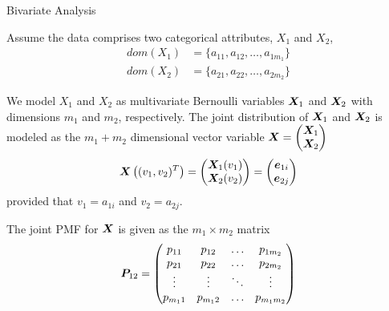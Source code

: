\begin{frame}{Bivariate Analysis}

  \small
Assume the data comprises two categorical
attributes, $X_1$ and $X_2$,
\begin{align*}
dom(X_1) &= \{a_{11}, a_{12}, \ldots, a_{1m_1}\}\\
dom(X_2) &= \{a_{21}, a_{22}, \ldots, a_{2m_2}\}
\end{align*}

We model
$X_1$ and $X_2$ as multivariate Bernoulli variables ${\boldsymbol X}_1$ and
${\boldsymbol X}_2$ with dimensions $m_1$ and $m_2$, respectively.
The joint distribution of ${\boldsymbol X}_1$ and ${\boldsymbol X}_2$
is modeled as the $m_1+m_2$ dimensional
vector variable ${\boldsymbol X} = \begin{pmatrix} {\boldsymbol X}_1\\{\boldsymbol X}_2 \end{pmatrix}$
\begin{align*}
{\boldsymbol X}\left((v_1, v_2)^T\right) = \begin{pmatrix} {\boldsymbol X}_1(v_1)\\{\boldsymbol X}_2(v_2) \end{pmatrix}
= \begin{pmatrix} {\boldsymbol e}_{1i}\\ {\boldsymbol e}_{2j} \end{pmatrix}
\end{align*}
provided that  $v_1 = a_{1i}$ and $v_2 = a_{2j}$.

The joint PMF for ${\boldsymbol X}$ is given as the $m_1 \times
m_2$ matrix
\begin{align*}
    {\boldsymbol P}_{12} =
    \begin{pmatrix} 
    p_{11} & p_{12} & \dots & p_{1m_2}\\
    p_{21} & p_{22} & \dots & p_{2m_2}\\
    \vdots & \vdots & \ddots & \vdots\\
    p_{m_11} & p_{m_12} & \dots & p_{m_1m_2}\\
     \end{pmatrix}
\end{align*}
\end{frame}



